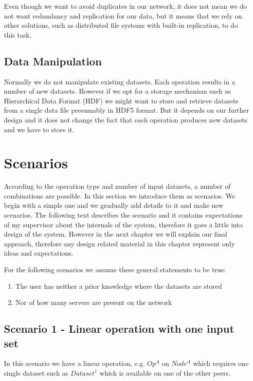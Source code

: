 Even though we want to avoid duplicates in our network, it does not mean we do not want redundancy and replication for our 
data, but it means that we rely on other solutions, such as distributed file systems with built-in replication, to do this task.

\subsection{Data Manipulation}
Normally we do not manipulate existing datasets. Each operation results in a number of new datasets. However if we
opt for a storage mechanism such as Hierarchical Data Format (HDF) we might want to store and retrieve datasets from
a single data file presumably in HDF5 format. But it depends on our further design and it does not change the fact
that each operation produces new datasets and we have to store it.

\section{Scenarios}
According to the operation type and number of input datasets, a number of combinations are possible.
In this section we introduce them as scenarios. We begin with a simple one and we gradually add details 
to it and make new scenarios. The following text describes the scenario and it contains expectations of 
my supervisor about the internals of the system, therefore it goes a little into design of the system. 
However in the next chapter we will explain our final approach, therefore any design related material in
this chapter represent only ideas and expectations.%

For the following scenarios we assume these general statements to be true:
\begin{enumerate}
\item The user has neither a prior knowledge where the datasets are stored
\item Nor of how many servers are present on the network
\end{enumerate}

\subsection{Scenario 1 - Linear operation with one input set}
\label{sc:sc1}
In this scenario we have a linear operation, e.g. \(Op^A\) on \(Node^A\) which
requires one single dataset such as \( Dataset^1 \) which is available on one of the other peers.

